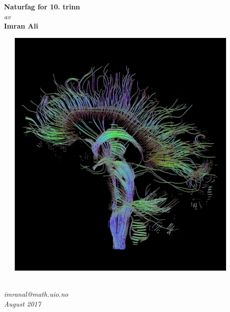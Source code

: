 \documentclass[main.tex]{subfiles}
\begin{document}
\thispagestyle{empty}
\begin{center}        %
  \vspace{5mm}        %
  \LARGE
  \textbf{Naturfag for 10. trinn} \\
  \Large
  \vspace{10mm}
  \textsl{av} \\
  \vspace{2mm}
  \large
  \textbf{Imran Ali} \\
  \vspace{5mm}
  \centerline{\includegraphics[width=125mm,height=125mm]{../figures/DTI-mri_wikipedia.jpg}} 
  \vspace{10mm}
  \textsl{} \\
  \textsl{imranal@math.uio.no} \\
  \vspace{5mm}
  \large
  \textsl{August 2017} \\
  \vspace{2cm}


\end{center}
\end{document}

